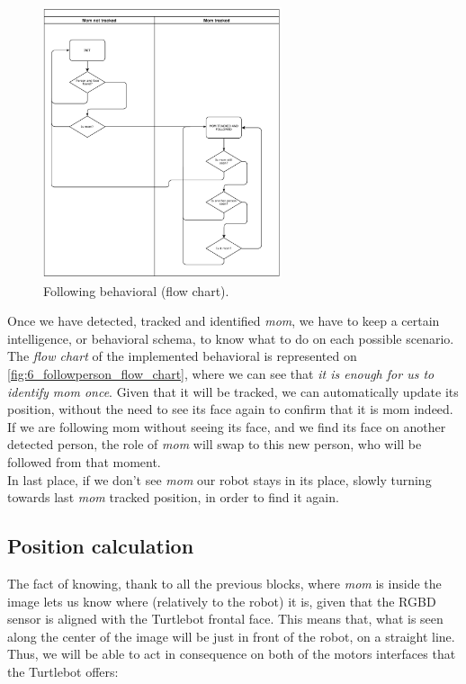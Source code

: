 		\begin{figure}
			\centering
			\includegraphics[width=7cm]{images/followperson_flowchart_cropped}
			\caption{Following behavioral (flow chart).}
			\label{fig:6_followperson_flow_chart}
		\end{figure}
		Once we have detected, tracked and identified \emph{mom}, we have to keep a certain intelligence, or behavioral schema, to know what to do on each possible scenario. The \emph{flow chart} of the implemented behavioral is represented on \autoref{fig:6_followperson_flow_chart}, where we can see that \emph{it is enough for us to identify mom once}. Given that it will be tracked, we can automatically update its position,  without the need to see its face again to confirm that it is mom indeed. If we are following mom without seeing its face, and we find its face on another detected person, the role of \emph{mom} will swap to this new person, who will be followed from that moment.\\

		In last place, if we don't see \emph{mom} our robot stays in its place, slowly turning towards last \emph{mom} tracked position, in order to find it again.

	\subsection{Position calculation}
		The fact of knowing, thank to  all the previous blocks, where \emph{mom} is inside the image lets us know where (relatively to the robot) it is, given that the RGBD sensor is aligned with the Turtlebot frontal face. This means that, what is seen along the center of the image will be just in front of the robot, on a straight line. Thus, we will be able to act in consequence on both of the motors interfaces that the Turtlebot offers:
		
